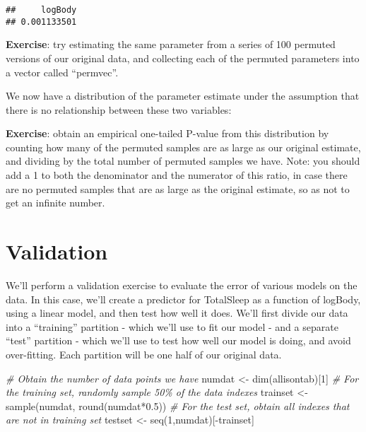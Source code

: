 \documentclass[
]{book}
\newenvironment{Shaded}{\begin{snugshade}}{\end{snugshade}}
\newcommand{\AttributeTok}[1]{\textcolor[rgb]{0.77,0.63,0.00}{#1}}
\newcommand{\CommentTok}[1]{\textcolor[rgb]{0.56,0.35,0.01}{\textit{#1}}}
\newcommand{\DecValTok}[1]{\textcolor[rgb]{0.00,0.00,0.81}{#1}}
\newcommand{\FloatTok}[1]{\textcolor[rgb]{0.00,0.00,0.81}{#1}}
\newcommand{\FunctionTok}[1]{\textcolor[rgb]{0.00,0.00,0.00}{#1}}
\newcommand{\NormalTok}[1]{#1}
\newcommand{\OtherTok}[1]{\textcolor[rgb]{0.56,0.35,0.01}{#1}}
\newcommand{\SpecialCharTok}[1]{\textcolor[rgb]{0.00,0.00,0.00}{#1}}
\begin{document}
\begin{Shaded}
\end{Shaded}

\begin{verbatim}
##     logBody 
## 0.001133501
\end{verbatim}

\textbf{Exercise}: try estimating the same parameter from a series of 100 permuted versions of our original data, and collecting each of the permuted parameters into a vector called ``permvec''.

We now have a distribution of the parameter estimate under the assumption that there is no relationship between these two variables:

\textbf{Exercise}: obtain an empirical one-tailed P-value from this distribution by counting how many of the permuted samples are as large as our original estimate, and dividing by the total number of permuted samples we have. Note: you should add a 1 to both the denominator and the numerator of this ratio, in case there are no permuted samples that are as large as the original estimate, so as not to get an infinite number.

\hypertarget{validation}{%
\section{Validation}\label{validation}}

We'll perform a validation exercise to evaluate the error of various models on the data. In this case, we'll create a predictor for TotalSleep as a function of logBody, using a linear model, and then test how well it does. We'll first divide our data into a ``training'' partition - which we'll use to fit our model - and a separate ``test'' partition - which we'll use to test how well our model is doing, and avoid over-fitting. Each partition will be one half of our original data.

\begin{Shaded}
\begin{Highlighting}[]
\CommentTok{\# Obtain the number of data points we have}
\NormalTok{numdat }\OtherTok{\textless{}{-}} \FunctionTok{dim}\NormalTok{(allisontab)[}\DecValTok{1}\NormalTok{]}
\CommentTok{\# For the training set, randomly sample 50\% of the data indexes}
\NormalTok{trainset }\OtherTok{\textless{}{-}} \FunctionTok{sample}\NormalTok{(numdat, }\FunctionTok{round}\NormalTok{(numdat}\SpecialCharTok{*}\FloatTok{0.5}\NormalTok{))}
\CommentTok{\# For the test set, obtain all indexes that are not in training set}
\NormalTok{testset }\OtherTok{\textless{}{-}} \FunctionTok{seq}\NormalTok{(}\DecValTok{1}\NormalTok{,numdat)[}\SpecialCharTok{{-}}\NormalTok{trainset]}
\end{Highlighting}
\end{Shaded}
\end{document}
